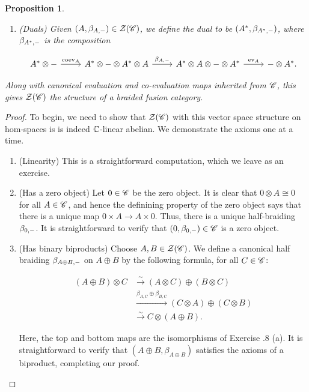 \documentclass{article}
\newtheorem{proposition}{Proposition}[section]
\theoremstyle{definition}
\numberwithin{figure}{section}
\begin{document}
\begin{enumerate}[\thesection .1.]
\begin{proposition}
\begin{enumerate}
\item (Duals) Given $(A,\beta_{A,\--})\in \mathcal{Z}(\mathscr{C})$, we define the dual to be $(A^*,\beta_{A^*,\--})$, where $\beta_{A^*,\--}$ is the composition

\[\begin{tikzcd}
	{A^*\otimes \--} & {A^*\otimes \-- \otimes A^*\otimes A} & {A^*\otimes A\otimes \-- \otimes A^*} & {\--\otimes A^*}.
	\arrow["{\coev_{A}}", from=1-1, to=1-2]
	\arrow["{\beta_{A,\--}}", from=1-2, to=1-3]
	\arrow["{\ev_A}", from=1-3, to=1-4]
\end{tikzcd}\]
\end{enumerate}

Along with canonical evaluation and co-evaluation maps inherited from $\mathscr{C}$, this gives $\mathcal{Z}(\mathscr{C})$ the structure of a braided fusion category.
\end{proposition}
\begin{proof} To begin, we need to show that $\mathcal{Z}(\mathscr{C})$ with this vector space structure on hom-spaces is is indeed $\mathbb{C}$-linear abelian. We demonstrate the axioms one at a time.

\begin{enumerate}
\item (Linearity) This is a straightforward computation, which we leave as an exercise.

\item (Has a zero object) Let $0\in \mathscr{C}$ be the zero object. It is clear that $0\otimes A\cong 0$ for all $A\in \mathscr{C}$, and hence the definining property of the zero object says that there is a unique map $0\times A\to A\times 0$. Thus, there is a unique half-braiding $\beta_{0,\--}$. It is straightforward to verify that $(0,\beta_{0,\--})\in \mathscr{C}$ is a zero object.

\item (Has binary biproducts) Choose $A,B\in \mathcal{Z}(\mathscr{C})$. We define a canonical half braiding $\beta_{A\oplus B,\--}$ on $A\oplus B$ by the following formula, for all $C\in \mathscr{C}$:

\begin{align*}
(A\oplus B)\otimes C&\xrightarrow{\sim} (A\otimes C)\oplus (B\otimes C)\\
&\xrightarrow{\beta_{A,C}\oplus \beta_{B,C}} (C\otimes A)\oplus (C\otimes B)\\
&\xrightarrow{\sim} C\otimes (A\oplus B).
\end{align*}

Here, the top and bottom maps are the isomorphisms of Exercise \thesection.8 (a). It is straightforward to verify that $(A\oplus B,\beta_{A\oplus B})$ satisfies the axioms of a biproduct, completing our proof.


\end{enumerate}
\end{proof}
\end{enumerate}
\end{document}
